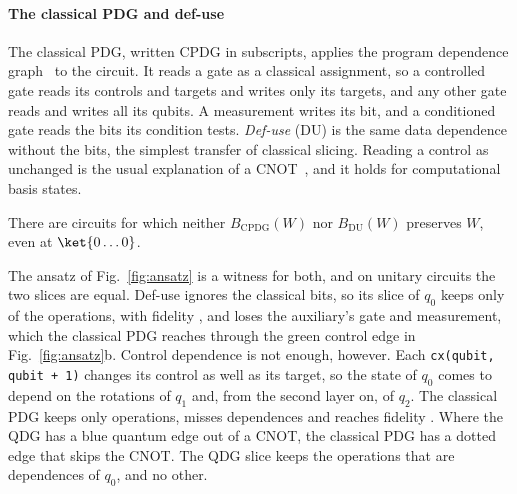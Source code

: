 \paragraph*{The classical PDG and def-use}
The classical PDG, written CPDG in subscripts, applies the program dependence graph~\cite{ferrante1987pdg} to the
circuit. It reads a gate as a classical assignment, so a controlled gate reads its controls and targets and writes
only its targets, and any other gate reads and writes all its qubits. A measurement writes its bit, and a
conditioned gate reads the bits its condition tests. \emph{Def-use} (DU) is the same data dependence without the
bits, the simplest transfer of classical slicing. Reading a control as unchanged is the usual explanation of a
CNOT~\cite{ramalho2025road}, and it holds for computational basis states.

\begin{proposition}\label{prop:du}
There are circuits for which neither $B_{\mathrm{CPDG}}(W)$ nor $B_{\mathrm{DU}}(W)$ preserves $W$, even at
$\ket{0\dots0}$.
\end{proposition}

The ansatz of Fig.~\ref{fig:ansatz} is a witness for both, and on unitary circuits the two slices are equal.
Def-use ignores the classical bits, so its slice of $q_0$ keeps only \numAnsDuOps{} of the \numAnsOps{} operations,
with fidelity \numAnsDuFidelity{}, and loses the auxiliary's gate and measurement, which the classical PDG reaches
through the green control edge in Fig.~\ref{fig:ansatz}b. Control dependence is not enough, however. Each
\texttt{cx(qubit, qubit + 1)} changes its control as well as its target, so the state of $q_0$ comes to depend on the
rotations of $q_1$ and, from the second layer on, of $q_2$. The classical PDG keeps only \numAnsCpdgOps{}
operations, misses \numAnsCpdgMissed{} dependences and reaches fidelity \numAnsCpdgFidelity{}. Where the QDG has
a blue quantum edge out of a CNOT, the classical PDG has a dotted edge that skips the CNOT. The QDG slice keeps the
\numAnsWireOps{} operations that are dependences of $q_0$, and no other.

